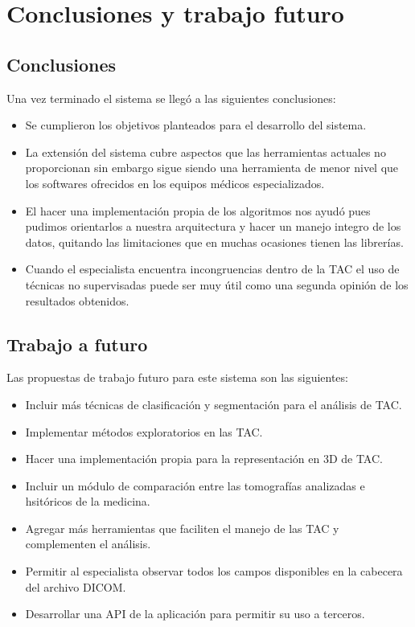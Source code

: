 \documentclass[12pt]{report}
\begin{document}
\chapter{Conclusiones y trabajo futuro}
\section{Conclusiones}
Una vez terminado el sistema se llegó a las siguientes conclusiones:
\begin{itemize}
\item Se cumplieron los objetivos planteados para el desarrollo del sistema.
\item La extensión del sistema cubre aspectos que las herramientas actuales no proporcionan sin embargo sigue siendo una herramienta de menor nivel que los softwares ofrecidos en los equipos médicos especializados.
\item El hacer una implementación propia de los algoritmos nos ayudó pues pudimos orientarlos a nuestra arquitectura y hacer un manejo integro de los datos, quitando las limitaciones que en muchas ocasiones tienen las librerías.
\item Cuando el especialista encuentra incongruencias dentro de la TAC el uso de técnicas no supervisadas puede ser muy útil como una segunda opinión de los resultados obtenidos.
\end{itemize}


\section{Trabajo a futuro}
Las propuestas de trabajo futuro para este sistema son las siguientes:
\begin{itemize}
\item Incluir más técnicas de clasificación y segmentación para el análisis de TAC.
\item Implementar métodos exploratorios en las TAC.
\item Hacer una implementación propia para la representación en 3D de TAC.
\item Incluir un módulo de comparación entre las tomografías analizadas e hsitóricos de la medicina.
\item Agregar más herramientas que faciliten el manejo de las TAC y complementen el análisis.
\item Permitir al especialista observar todos los campos disponibles en la cabecera del archivo DICOM.
\item Desarrollar una API de la aplicación para permitir su uso a terceros.
\end{itemize}
\end{document}
